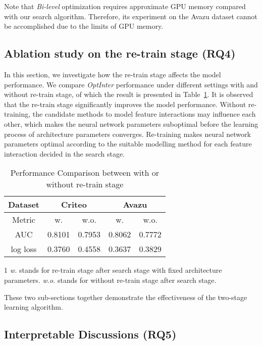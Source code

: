 \documentclass[conference]{IEEEtran}
\begin{document}
Note that \emph{Bi-level} optimization requires approximate  GPU memory compared with our search algorithm. Therefore, its experiment on the Avazu dataset cannot be accomplished due to the limits of GPU memory.

\subsection{Ablation study on the re-train stage (RQ4)}

In this section, we investigate how the re-train stage affects the model performance. 
We compare \textit{OptInter} performance under different settings with and without re-train stage, of which the result is presented in Table~\ref{Table:retrain}. 
It is observed that the re-train stage significantly improves the model performance. 
Without re-training, the candidate methods to model feature interactions may influence each other, which makes the neural network parameters  suboptimal before the learning process of architecture parameters converges.
Re-training makes neural network parameters optimal according to the suitable modelling method for each feature interaction decided in the search stage.

\begin{table}[!htbp]
    \renewcommand\arraystretch{1.05}
	\centering
	\caption{Performance Comparison between with or without re-train stage}
	\begin{tabular}{c|cc|cc}
		\hline
		  Dataset & \multicolumn{2}{c|}{Criteo} & \multicolumn{2}{c}{Avazu} \\
		\hline
		  Metric & w. & w.o. & w. & w.o. \\
		\hline
		  AUC         & 0.8101 & 0.7953 & 0.8062 & 0.7772 \\
		  log loss    & 0.3760 & 0.4558 & 0.3637 & 0.3829 \\
		\hline
	\end{tabular}
	\begin{tablenotes}
    \footnotesize
    \item[1] \textit{w.} stands for re-train stage after search stage with fixed architecture parameters. \textit{w.o.} stands for without re-train stage after search stage.
    \end{tablenotes}
	\label{Table:retrain}
\end{table}

These two sub-sections together demonstrate the effectiveness of the two-stage learning algorithm.


\subsection{Interpretable Discussions (RQ5)}
\end{document}

